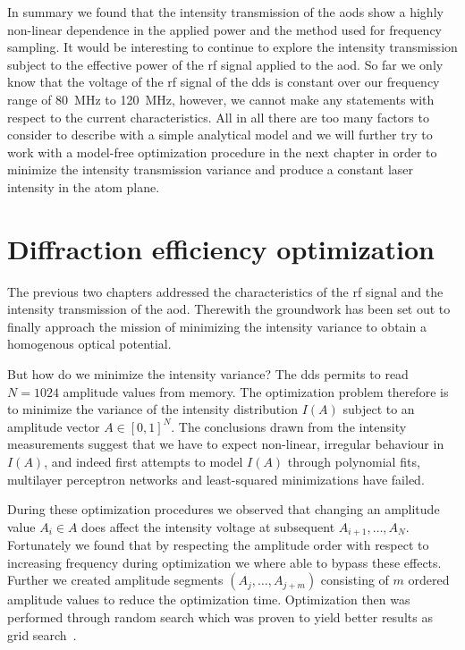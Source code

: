 In summary we found that the intensity transmission of the \gls{aod}s show a
highly non-linear dependence in the applied power and the method used for
frequency sampling. It would be interesting to continue to explore the
intensity transmission subject to the effective power of the \gls{rf} signal
applied to the \gls{aod}. So far we only know that the voltage of the \gls{rf}
signal of the \gls{dds} is constant over our frequency range of
\SI{80}{\mega\hertz} to \SI{120}{\mega\hertz}, however, we cannot make any
statements with respect to the current characteristics. All in all there are
too many factors to consider to describe with a simple analytical model and we
will further try to work with a model-free optimization procedure in the next
chapter in order to minimize the intensity transmission variance and produce
a constant laser intensity in the atom plane.

\section{Diffraction efficiency optimization}

The previous two chapters addressed the characteristics of the \gls{rf}
signal and the intensity transmission of the \gls{aod}. Therewith the
groundwork has been set out to finally approach the mission of minimizing the
intensity variance to obtain a homogenous optical potential.

But how do we minimize the intensity variance? The \gls{dds} permits to read
$N=1024$ amplitude values from memory. The optimization problem therefore is to
minimize the variance of the intensity distribution $I(A)$ subject to an
amplitude vector $A\in{[0,1]}^N$. The conclusions drawn from the intensity
measurements suggest that we have to expect non-linear, irregular behaviour
in $I(A)$, and indeed first attempts to model $I(A)$ through polynomial fits,
multilayer perceptron networks and least-squared minimizations have failed.

During these optimization procedures we observed that changing an amplitude
value $A_i\in A$ does affect the intensity voltage at subsequent
$A_{i+1},\dots,A_N$. Fortunately we found that by respecting the amplitude
order with respect to increasing frequency during optimization we where able
to bypass these effects. Further we created amplitude segments
$\left(A_j,\dots,A_{j+m}\right)$ consisting of $m$ ordered amplitude values
to reduce the optimization time. Optimization then was performed through
random search which was proven to yield better results as grid
search~\cite{Bergstra2012}.

